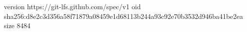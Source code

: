 version https://git-lfs.github.com/spec/v1
oid sha256:d8e2c3d356a58f71879a08459e1d68113b244a93c92e70b3532d946ba41be2ea
size 8484
